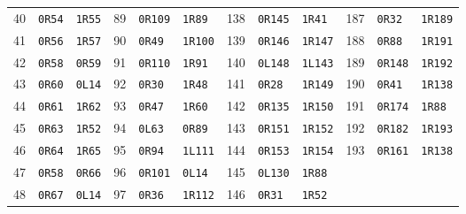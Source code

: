 \begin{center}
\begin{tabular}{@{}rll@{\quad}rll@{\quad}rll@{\quad}rll@{}}
40 & \texttt{0R54} & \texttt{1R55} & 89 & \texttt{0R109} & \texttt{1R89} & 138 & \texttt{0R145} & \texttt{1R41} & 187 & \texttt{0R32} & \texttt{1R189}\\
41 & \texttt{0R56} & \texttt{1R57} & 90 & \texttt{0R49} & \texttt{1R100} & 139 & \texttt{0R146} & \texttt{1R147} & 188 & \texttt{0R88} & \texttt{1R191}\\
42 & \texttt{0R58} & \texttt{0R59} & 91 & \texttt{0R110} & \texttt{1R91} & 140 & \texttt{0L148} & \texttt{1L143} & 189 & \texttt{0R148} & \texttt{1R192}\\
43 & \texttt{0R60} & \texttt{0L14} & 92 & \texttt{0R30} & \texttt{1R48} & 141 & \texttt{0R28} & \texttt{1R149} & 190 & \texttt{0R41} & \texttt{1R138}\\
44 & \texttt{0R61} & \texttt{1R62} & 93 & \texttt{0R47} & \texttt{1R60} & 142 & \texttt{0R135} & \texttt{1R150} & 191 & \texttt{0R174} & \texttt{1R88}\\
45 & \texttt{0R63} & \texttt{1R52} & 94 & \texttt{0L63} & \texttt{0R89} & 143 & \texttt{0R151} & \texttt{1R152} & 192 & \texttt{0R182} & \texttt{1R193}\\
46 & \texttt{0R64} & \texttt{1R65} & 95 & \texttt{0R94} & \texttt{1L111} & 144 & \texttt{0R153} & \texttt{1R154} & 193 & \texttt{0R161} & \texttt{1R138}\\
47 & \texttt{0R58} & \texttt{0R66} & 96 & \texttt{0R101} & \texttt{0L14} & 145 & \texttt{0L130} & \texttt{1R88} &  &  & \\
48 & \texttt{0R67} & \texttt{0L14} & 97 & \texttt{0R36} & \texttt{1R112} & 146 & \texttt{0R31} & \texttt{1R52} &  &  & \\
\bottomrule
\end{tabular}
\end{center}
\endgroup
